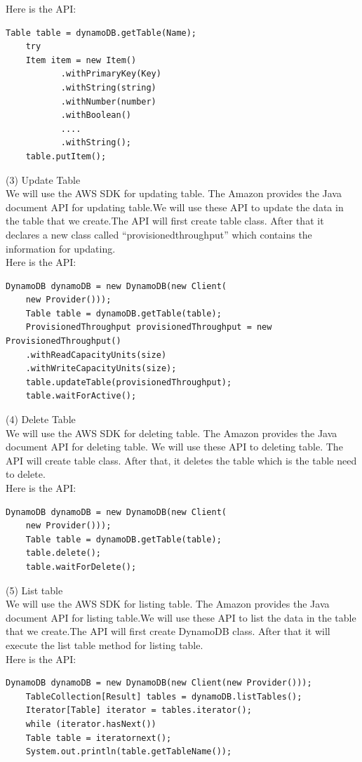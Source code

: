     Here is the API\cite{w1}:\\
    \begin{lstlisting}[caption=API for Upload data]
    Table table = dynamoDB.getTable(Name);
    try 
    Item item = new Item()
           .withPrimaryKey(Key)
           .withString(string)
           .withNumber(number)
           .withBoolean()
           ....
           .withString();
    table.putItem();
  \end{lstlisting}
    (3) Update Table\\
    We will use the AWS SDK for updating table. The Amazon provides the Java document API for updating table.We will use these API to update the data in the table that we create.The API will first create table class. After that it declares a new class called “provisionedthroughput” which contains the information for updating.\\
    Here is the API\cite{w1}:
      \begin{lstlisting}[caption=API for update table]
    DynamoDB dynamoDB = new DynamoDB(new Client(
    new Provider()));
    Table table = dynamoDB.getTable(table);
    ProvisionedThroughput provisionedThroughput = new ProvisionedThroughput()
    .withReadCapacityUnits(size)
    .withWriteCapacityUnits(size);
    table.updateTable(provisionedThroughput);
    table.waitForActive();
\end{lstlisting}
    (4) Delete Table\\
    We will use the AWS SDK for deleting table. The Amazon provides the Java document API for deleting table. We will use these API to deleting table. The API will create table class. After that, it deletes the table which is the table need to delete.\\
    Here is the API\cite{w1}:
      \begin{lstlisting}[caption=API for delete data]
    DynamoDB dynamoDB = new DynamoDB(new Client(
    new Provider()));
    Table table = dynamoDB.getTable(table);
    table.delete();
    table.waitForDelete();
	\end{lstlisting}
    (5) List table\\
    We will use the AWS SDK for listing table. The Amazon provides the Java document API for listing table.We will use these API to list the data in the table that we create.The API will first create DynamoDB class. After that it will execute the list table method for listing table.\\
    Here is the API\cite{w1}:\\
     \begin{lstlisting}[caption=API for list table]
    DynamoDB dynamoDB = new DynamoDB(new Client(new Provider()));
    TableCollection[Result] tables = dynamoDB.listTables();
    Iterator[Table] iterator = tables.iterator();
    while (iterator.hasNext()) 
    Table table = iteratornext();
    System.out.println(table.getTableName());
    \end{lstlisting}
